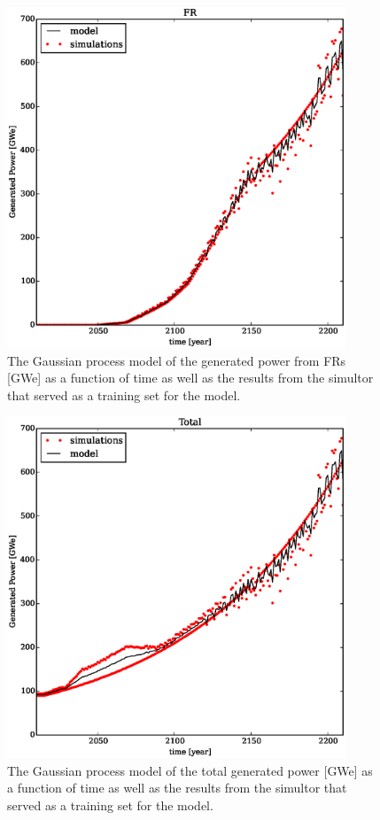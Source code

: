 \begin{figure}[htb]
\centering
\includegraphics[width=0.9\textwidth]{gwe-model-fr.eps}
\caption{The Gaussian process model of the generated power from FRs [GWe] 
as a function of time as well as the results from the simultor that served as a 
training set for the model.}
\label{gwe-model-fr}
\end{figure}

\begin{figure}[htb]
\centering
\includegraphics[width=0.9\textwidth]{gwe-model-total.eps}
\caption{The Gaussian process model of the total generated power [GWe] 
as a function of time as well as the results from the simultor that served as a 
training set for the model.}
\label{gwe-model-total}
\end{figure}

